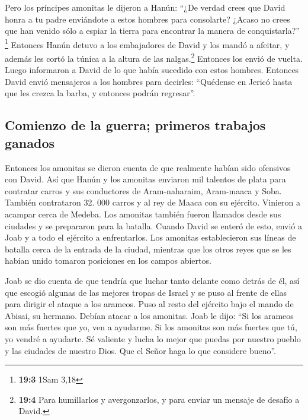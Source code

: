  Pero los príncipes amonitas le dijeron a Hanún: ``¿De
verdad crees que David honra a tu padre enviándote a estos hombres para
consolarte? ¿Acaso no crees que han venido sólo a espiar la tierra para
encontrar la manera de conquistarla?'' \footnote{\textbf{19:3} 1Sam 3,18}
 Entonces Hanún detuvo a los embajadores de David y los
mandó a afeitar, y además les cortó la túnica a la altura de las
nalgas.\footnote{\textbf{19:4} Para humillarlos y avergonzarlos, y para
  enviar un mensaje de desafío a David.} Entonces los envió de vuelta.
 Luego informaron a David de lo que había sucedido con
estos hombres. Entonces David envió mensajeros a los hombres para
decirles: ``Quédense en Jericó hasta que les crezca la barba, y entonces
podrán regresar''.

\hypertarget{comienzo-de-la-guerra-primeros-trabajos-ganados}{%
\subsection{Comienzo de la guerra; primeros trabajos
ganados}\label{comienzo-de-la-guerra-primeros-trabajos-ganados}}

 Entonces los amonitas se dieron cuenta de que realmente
habían sido ofensivos con David. Así que Hanún y los amonitas enviaron
mil talentos de plata para contratar carros y sus conductores de
Aram-naharaim, Aram-maaca y Soba.  También contrataron 32.
000 carros y al rey de Maaca con su ejército. Vinieron a acampar cerca
de Medeba. Los amonitas también fueron llamados desde sus ciudades y se
prepararon para la batalla.  Cuando David se enteró de
esto, envió a Joab y a todo el ejército a enfrentarlos. 
Los amonitas establecieron sus líneas de batalla cerca de la entrada de
la ciudad, mientras que los otros reyes que se les habían unido tomaron
posiciones en los campos abiertos.

 Joab se dio cuenta de que tendría que luchar tanto
delante como detrás de él, así que escogió algunas de las mejores tropas
de Israel y se puso al frente de ellas para dirigir el ataque a los
arameos.  Puso al resto del ejército bajo el mando de
Abisai, su hermano. Debían atacar a los amonitas.  Joab
le dijo: ``Si los arameos son más fuertes que yo, ven a ayudarme. Si los
amonitas son más fuertes que tú, yo vendré a ayudarte. 
Sé valiente y lucha lo mejor que puedas por nuestro pueblo y las
ciudades de nuestro Dios. Que el Señor haga lo que considere bueno''.

